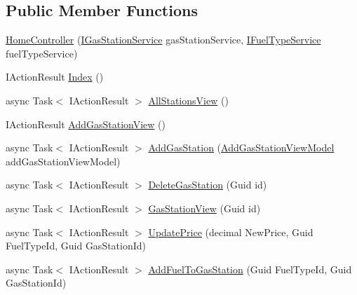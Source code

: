 \subsection*{Public Member Functions}
\begin{DoxyCompactItemize}
\item 
\mbox{\hyperlink{class_gasoline_1_1_api_1_1_controllers_1_1_home_controller_a65c957f2baa0cd11017c11837a098189}{Home\+Controller}} (\mbox{\hyperlink{interface_gasoline_1_1_data_1_1_services_1_1_i_gas_station_service}{I\+Gas\+Station\+Service}} gas\+Station\+Service, \mbox{\hyperlink{interface_gasoline_1_1_data_1_1_services_1_1_i_fuel_type_service}{I\+Fuel\+Type\+Service}} fuel\+Type\+Service)
\item 
I\+Action\+Result \mbox{\hyperlink{class_gasoline_1_1_api_1_1_controllers_1_1_home_controller_ac1153104ae0730a37c300bb5f6db6b47}{Index}} ()
\item 
async Task$<$ I\+Action\+Result $>$ \mbox{\hyperlink{class_gasoline_1_1_api_1_1_controllers_1_1_home_controller_aac788fbb41e43b2b4fd98a549a30581a}{All\+Stations\+View}} ()
\item 
I\+Action\+Result \mbox{\hyperlink{class_gasoline_1_1_api_1_1_controllers_1_1_home_controller_ae18ad72814e4c9110ef5ed4e8fa47a44}{Add\+Gas\+Station\+View}} ()
\item 
async Task$<$ I\+Action\+Result $>$ \mbox{\hyperlink{class_gasoline_1_1_api_1_1_controllers_1_1_home_controller_a5a6fa27b91863fe033e97e5c36d4f2d9}{Add\+Gas\+Station}} (\mbox{\hyperlink{class_gasoline_1_1_api_1_1_models_1_1_home_1_1_add_gas_station_view_model}{Add\+Gas\+Station\+View\+Model}} add\+Gas\+Station\+View\+Model)
\item 
async Task$<$ I\+Action\+Result $>$ \mbox{\hyperlink{class_gasoline_1_1_api_1_1_controllers_1_1_home_controller_a1cad65a10bcde3734ad67ee17b2eccdd}{Delete\+Gas\+Station}} (Guid id)
\item 
async Task$<$ I\+Action\+Result $>$ \mbox{\hyperlink{class_gasoline_1_1_api_1_1_controllers_1_1_home_controller_a43d8335efef6a8ccbe9ae32522e35d04}{Gas\+Station\+View}} (Guid id)
\item 
async Task$<$ I\+Action\+Result $>$ \mbox{\hyperlink{class_gasoline_1_1_api_1_1_controllers_1_1_home_controller_a99e21389f410ccd144757cd589c57c51}{Update\+Price}} (decimal New\+Price, Guid Fuel\+Type\+Id, Guid Gas\+Station\+Id)
\item 
async Task$<$ I\+Action\+Result $>$ \mbox{\hyperlink{class_gasoline_1_1_api_1_1_controllers_1_1_home_controller_acbf8bfd66f84fb558cc60b9fa7056e91}{Add\+Fuel\+To\+Gas\+Station}} (Guid Fuel\+Type\+Id, Guid Gas\+Station\+Id)

\end{DoxyCompactItemize}
